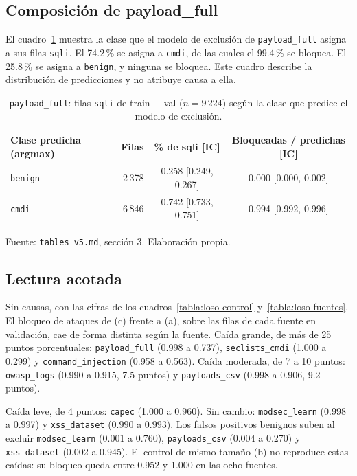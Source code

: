 \subsection{Composición de payload\_full}\label{anexo:loso-payload-full}

El cuadro~\ref{tabla:loso-payload-full} muestra la clase que el modelo de exclusión de \texttt{payload\_full} asigna a sus filas \texttt{sqli}. El 74.2\,\% se asigna a \texttt{cmdi}, de las cuales el 99.4\,\% se bloquea. El 25.8\,\% se asigna a \texttt{benign}, y ninguna se bloquea. Este cuadro describe la distribución de predicciones y no atribuye causa a ella.

\begin{table}[htbp]
\centering
\footnotesize
\setlength{\tabcolsep}{3pt}
\begin{tabular}{|l|r|c|c|}
\hline
\textbf{Clase predicha (argmax)} & \textbf{Filas} & \textbf{\% de sqli [IC]} & \textbf{Bloqueadas / predichas [IC]} \\ \hline
\texttt{benign} & 2\,378 & 0.258 [0.249, 0.267] & 0.000 [0.000, 0.002] \\ \hline
\texttt{cmdi} & 6\,846 & 0.742 [0.733, 0.751] & 0.994 [0.992, 0.996] \\ \hline
\end{tabular}
\caption{\texttt{payload\_full}: filas \texttt{sqli} de train + val ($n = 9\,224$) según la clase que predice el modelo de exclusión.}
\label{tabla:loso-payload-full}
\par\smallskip\footnotesize Fuente: \texttt{tables\_v5.md}, sección 3. Elaboración propia.
\end{table}

\subsection{Lectura acotada}\label{anexo:loso-lectura}

Sin causas, con las cifras de los cuadros~\ref{tabla:loso-control} y~\ref{tabla:loso-fuentes}. El bloqueo de ataques de (c) frente a (a), sobre las filas de cada fuente en validación, cae de forma distinta según la fuente. Caída grande, de más de 25 puntos porcentuales: \texttt{payload\_full} (0.998 a 0.737), \texttt{seclists\_cmdi} (1.000 a 0.299) y \texttt{command\_injection} (0.958 a 0.563). Caída moderada, de 7 a 10 puntos: \texttt{owasp\_logs} (0.990 a 0.915, 7.5 puntos) y \texttt{payloads\_csv} (0.998 a 0.906, 9.2 puntos).

Caída leve, de 4 puntos: \texttt{capec} (1.000 a 0.960). Sin cambio: \texttt{modsec\_learn} (0.998 a 0.997) y \texttt{xss\_dataset} (0.990 a 0.993). Los falsos positivos benignos suben al excluir \texttt{modsec\_learn} (0.001 a 0.760), \texttt{payloads\_csv} (0.004 a 0.270) y \texttt{xss\_dataset} (0.002 a 0.945). El control de mismo tamaño (b) no reproduce estas caídas: su bloqueo queda entre 0.952 y 1.000 en las ocho fuentes.

